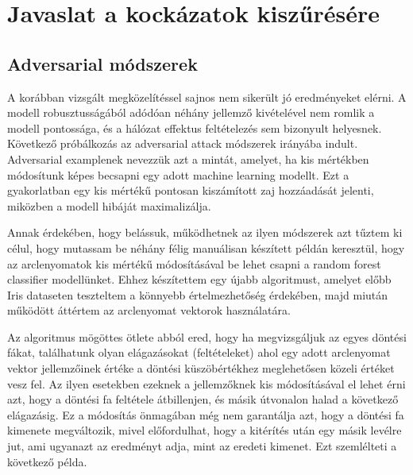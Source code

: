 \section{Javaslat a kockázatok kiszűrésére}
\label{sec:6}

\subsection{Adversarial módszerek}

A korábban vizsgált megközelítéssel sajnos nem sikerült jó eredményeket elérni. A modell robusztusságából adódóan néhány jellemző kivételével nem romlik a modell pontossága, és a hálózat effektus feltételezés sem bizonyult helyesnek. Következő próbálkozás az adversarial attack módszerek irányába indult. Adversarial examplenek nevezzük azt a mintát, amelyet, ha kis mértékben módosítunk képes becsapni egy adott machine learning modellt. Ezt a gyakorlatban egy kis mértékű pontosan kiszámított zaj hozzáadását jelenti, miközben a modell hibáját maximalizálja. 

Annak érdekében, hogy belássuk, működhetnek az ilyen módszerek azt tűztem ki célul, hogy mutassam be néhány félig manuálisan készített példán keresztül, hogy az arclenyomatok kis mértékű módosításával be lehet csapni a random forest classifier modellünket. Ehhez készítettem egy újabb algoritmust, amelyet előbb Iris dataseten teszteltem a könnyebb értelmezhetőség érdekében, majd miután működött áttértem az arclenyomat vektorok használatára.

Az algoritmus mögöttes ötlete abból ered, hogy ha megvizsgáljuk az egyes döntési fákat, találhatunk olyan elágazásokat (feltételeket) ahol egy adott arclenyomat vektor jellemzőinek értéke a döntési küszöbértékhez meglehetősen közeli értéket vesz fel. Az ilyen esetekben ezeknek a jellemzőknek kis módosításával el lehet érni azt, hogy a döntési fa feltétele átbillenjen, és másik útvonalon halad a következő elágazásig. Ez a módosítás önmagában még nem garantálja azt, hogy a döntési fa kimenete megváltozik, mivel előfordulhat, hogy a kitérítés után egy másik levélre jut, ami ugyanazt az eredményt adja, mint az eredeti kimenet. Ezt szemlélteti a következő példa.


